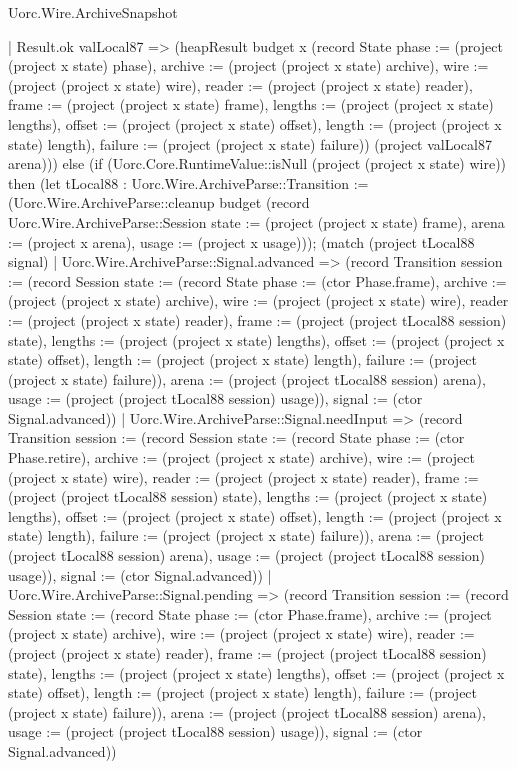 \begin{lexlean}{Uorc.Wire.ArchiveSnapshot}
\begin{semanticmodule}
{        | Result.ok valLocal87 => (heapResult budget x (record State {phase := (project (project x state) phase), archive := (project (project x state) archive), wire := (project (project x state) wire), reader := (project (project x state) reader), frame := (project (project x state) frame), lengths := (project (project x state) lengths), offset := (project (project x state) offset), length := (project (project x state) length), failure := (project (project x state) failure)}) (project valLocal87 arena))) else (if (Uorc.Core.RuntimeValue::isNull (project (project x state) wire)) then (let tLocal88 : Uorc.Wire.ArchiveParse::Transition := (Uorc.Wire.ArchiveParse::cleanup budget (record Uorc.Wire.ArchiveParse::Session {state := (project (project x state) frame), arena := (project x arena), usage := (project x usage)})); (match (project tLocal88 signal)
        | Uorc.Wire.ArchiveParse::Signal.advanced => (record Transition {session := (record Session {state := (record State {phase := (ctor Phase.frame), archive := (project (project x state) archive), wire := (project (project x state) wire), reader := (project (project x state) reader), frame := (project (project tLocal88 session) state), lengths := (project (project x state) lengths), offset := (project (project x state) offset), length := (project (project x state) length), failure := (project (project x state) failure)}), arena := (project (project tLocal88 session) arena), usage := (project (project tLocal88 session) usage)}), signal := (ctor Signal.advanced)})
        | Uorc.Wire.ArchiveParse::Signal.needInput => (record Transition {session := (record Session {state := (record State {phase := (ctor Phase.retire), archive := (project (project x state) archive), wire := (project (project x state) wire), reader := (project (project x state) reader), frame := (project (project tLocal88 session) state), lengths := (project (project x state) lengths), offset := (project (project x state) offset), length := (project (project x state) length), failure := (project (project x state) failure)}), arena := (project (project tLocal88 session) arena), usage := (project (project tLocal88 session) usage)}), signal := (ctor Signal.advanced)})
        | Uorc.Wire.ArchiveParse::Signal.pending => (record Transition {session := (record Session {state := (record State {phase := (ctor Phase.frame), archive := (project (project x state) archive), wire := (project (project x state) wire), reader := (project (project x state) reader), frame := (project (project tLocal88 session) state), lengths := (project (project x state) lengths), offset := (project (project x state) offset), length := (project (project x state) length), failure := (project (project x state) failure)}), arena := (project (project tLocal88 session) arena), usage := (project (project tLocal88 session) usage)}), signal := (ctor Signal.advanced)})
}
\end{semanticmodule}
\end{lexlean}
